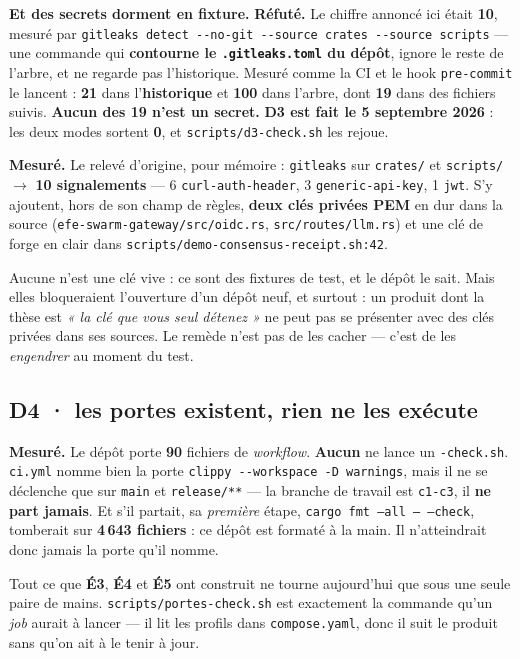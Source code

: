 \documentclass[11pt]{article}
\newcommand{\code}[1]{\texttt{\small #1}}
\newcommand{\best}[1]{{\color{efesolve}\textbf{#1}}}
\newcommand{\pire}[1]{{\color{efered}\textbf{#1}}}
\newcommand{\mm}[1]{\textbf{#1}}
\newcommand{\mesure}[1]{{\color{efeteal}\textbf{Mesuré.} }#1\par}
\newcommand{\refute}[1]{{\color{efered}\textbf{Réfuté.} }#1\par}
\newcommand{\fl}{$\rightarrow$}
\begin{document}
\smallskip
\textbf{Et des secrets dorment en fixture.}
\refute{Le chiffre annoncé ici était \pire{10}, mesuré par \code{gitleaks detect
-{}-no-git -{}-source crates -{}-source scripts} --- une commande qui \textbf{contourne le
\code{.gitleaks.toml} du dépôt}, ignore le reste de l'arbre, et ne regarde pas
l'historique. Mesuré comme la CI et le hook \code{pre-commit} le lancent : \pire{21}
dans l'\textbf{historique} et \pire{100} dans l'arbre, dont \pire{19} dans des fichiers
suivis. \textbf{Aucun des 19 n'est un secret.} \best{D3 est fait le 5 septembre 2026} :
les deux modes sortent \best{0}, et \code{scripts/d3-check.sh} les rejoue.}

\mesure{Le relevé d'origine, pour mémoire : \code{gitleaks} sur \code{crates/} et \code{scripts/} \fl{} \pire{10 signalements}
--- 6 \code{curl-auth-header}, 3 \code{generic-api-key}, 1 \code{jwt}. S'y ajoutent, hors de son
champ de règles, \pire{deux clés privées PEM} en dur dans la source
(\code{efe-swarm-gateway/src/oidc.rs}, \code{src/routes/llm.rs}) et une clé de forge en clair dans
\code{scripts/demo-consensus-receipt.sh:42}.}

Aucune n'est une clé vive : ce sont des fixtures de test, et le dépôt le sait. Mais elles
bloqueraient l'ouverture d'un dépôt neuf, et surtout : un produit dont la thèse est
\emph{« la clé que vous seul détenez »} ne peut pas se présenter avec des clés privées dans ses
sources. Le remède n'est pas de les cacher --- c'est de les \emph{engendrer} au moment du test.

\subsection{\mm{D4} · les portes existent, rien ne les exécute}
\mesure{Le dépôt porte \best{90} fichiers de \emph{workflow}. \pire{Aucun} ne lance un
\code{*-check.sh}. \code{ci.yml} nomme bien la porte \code{clippy -{}-workspace -D warnings},
mais il ne se déclenche que sur \code{main} et \code{release/**} --- la branche de travail est
\code{c1-c3}, il \pire{ne part jamais}. Et s'il partait, sa \emph{première} étape,
\code{cargo fmt --all -- --check}, tomberait sur \pire{4\,643 fichiers} : ce dépôt est formaté à
la main. Il n'atteindrait donc jamais la porte qu'il nomme.}

Tout ce que \mm{É3}, \mm{É4} et \mm{É5} ont construit ne tourne aujourd'hui que sous une seule
paire de mains. \code{scripts/portes-check.sh} est exactement la commande qu'un \emph{job} aurait
à lancer --- il lit les profils dans \code{compose.yaml}, donc il suit le produit sans qu'on ait à
le tenir à jour.
\end{document}
